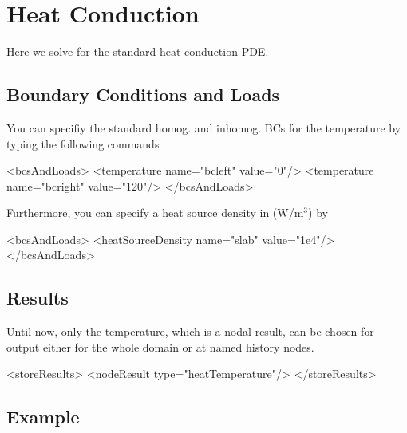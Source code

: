 \newpage
\section{Heat Conduction}
Here we solve for the standard heat conduction PDE.

\subsection{Boundary Conditions and Loads}
You can specifiy the standard homog. and inhomog. BCs for the
temperature by typing the following commands
\begin{xmllisting}
<bcsAndLoads>
    <temperature name="bcleft" value="0"/>
    <temperature name="bcright" value="120"/>
</bcsAndLoads>
\end{xmllisting}

Furthermore, you can specify a heat source density in (W/m$^3$) by
\begin{xmllisting}
<bcsAndLoads>
   <heatSourceDensity name="slab" value="1e4"/>          
</bcsAndLoads>
\end{xmllisting}


\subsection{Results}
Until now, only the temperature, which is a nodal result, can be chosen for
output either for the whole domain or at named history nodes.

\begin{xmllisting}
<storeResults>
   <nodeResult type="heatTemperature"/>
</storeResults>
\end{xmllisting}


\subsection{Example}

